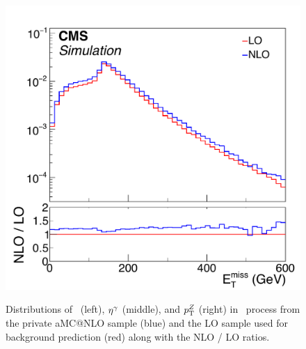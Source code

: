 \begin{figure}[htbp]
{    \includegraphics[]{Analysis/Figures/kfactor/ZG_met.pdf}
  }
  \caption{
    Distributions of \ETg\ (left), $\eta^{\gamma}$ (middle), and $p_{\mathrm{T}}^{{Z}}$ (right) in \zinvg\ process from the private aMC@NLO sample (blue) and the LO sample used for background prediction (red) along with the NLO / LO ratios.
  }
  \label{fig:zg_nlo_lo}
\end{figure}
